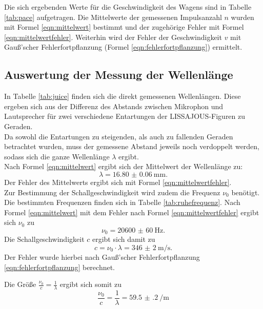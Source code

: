Die sich ergebenden Werte für die Geschwindigkeit des Wagens sind in Tabelle \ref{tab:pace}
aufgetragen. Die Mittelwerte der gemessenen Impulsanzahl $n$ wurden mit Formel
\eqref{eqn:mittelwert} bestimmt und der zugehörige Fehler mit Formel
\eqref{eqn:mittelwertfehler}. Weiterhin wird der Fehler der Geschwindigkeit $v$ mit
Gauß'scher Fehlerfortpflanzung (Formel \eqref{eqn:fehlerfortpflanzung}) ermittelt.\\
\FloatBarrier
\subsection{Auswertung der Messung der Wellenlänge}
\label{sec:wellenlaenge}
In Tabelle \ref{tab:juice} finden sich die direkt gemessenen Wellenlängen. Diese ergeben sich aus der Differenz des Abstands zwischen Mikrophon und Lautsprecher für zwei verschiedene Entartungen der LISSAJOUS-Figuren zu Geraden.\\
Da sowohl die Entartungen zu steigenden, als auch zu fallenden Geraden betrachtet wurden, muss der gemessene Abstand jeweils noch verdoppelt werden, sodass sich die ganze Wellenlänge $\lambda$ ergibt.\\
Nach Formel \eqref{eqn:mittelwert} ergibt sich der Mittelwert der Wellenlänge zu:
\begin{equation}
	\label{eqn:wellenlänge}
	\lambda=\SI{16.80(6)}{\milli\metre}\text{.}
\end{equation}
Der Fehler des Mittelwerts ergibt sich mit Formel \eqref{eqn:mittelwertfehler}.\\
Zur Bestimmung der Schallgeschwindigkeit wird zudem die Frequenz $\nu_{0}$ benötigt.
Die bestimmten Frequenzen finden sich in Tabelle \ref{tab:ruhefrequenz}.
Nach Formel \eqref{eqn:mittelwert} mit dem Fehler nach Formel \eqref{eqn:mittelwertfehler} ergibt sich $\nu_0$ zu
\begin{equation}
	\label{eqn:rrrruhe}
	\nu_0=\SI{20600(60)}{\Hz}\text{.}
\end{equation}
Die Schallgeschwindigkeit $c$ ergibt sich damit zu
\begin{equation}
	\label{eqn:Schallgeschwindigkeit}
	c=\nu_0 \cdot\lambda=\SI{346(2)}{\meter\per\second}\text{.}
\end{equation}
Der Fehler wurde hierbei nach Gauß'scher Fehlerfortpflanzung \eqref{eqn:fehlerfortpflanzung} berechnet.

Die Größe $\frac{\nu_0}{c}=\frac{1}{\lambda}$ ergibt sich somit zu
\begin{equation}
	\label{eqn:wichtige_größe}
	\frac{\nu_0}{c}=\frac{1}{\lambda}=\SI{59.5(2)}{\per\meter}
\end{equation}


